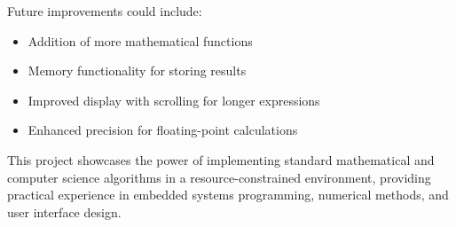 \documentclass[12pt,a4paper]{article}
\begin{document}
Future improvements could include:
\begin{itemize}
    \item Addition of more mathematical functions
    \item Memory functionality for storing results
    \item Improved display with scrolling for longer expressions
    \item Enhanced precision for floating-point calculations
\end{itemize}

This project showcases the power of implementing standard mathematical and computer science algorithms in a resource-constrained environment, providing practical experience in embedded systems programming, numerical methods, and user interface design.
\end{document}
